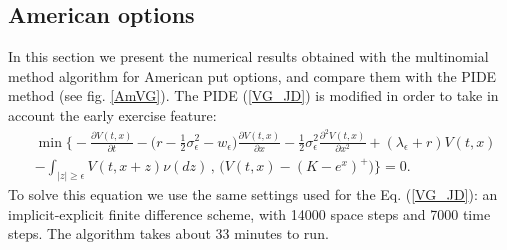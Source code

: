 \subsection{American options}

In this section we present the numerical results obtained with the multinomial method algorithm for American put options, and compare them with the PIDE method (see fig. \ref{AmVG}).
The PIDE (\ref{VG_JD}) is modified in order to take in account the early exercise feature:
\begin{align}\label{VG_Am_JD}
&  \min \biggl\{ - \frac{\partial V(t,x)}{\partial t} -
 \bigl( r-\frac{1}{2}\sigma_{\epsilon}^2 - w_{\epsilon} \bigr) \frac{\partial V(t,x)}{\partial x} 
 - \frac{1}{2}\sigma_{\epsilon}^2 \frac{\partial^2 V(t,x)}{\partial x^2} + (\lambda_{\epsilon} + r) V(t,x) \\ \nonumber
 &- \int_{|z| \geq \epsilon} V(t,x+z) \nu(dz) \, , \, \biggl( V(t,x) - (K-e^x)^+ \biggr) \biggr\} = 0.
\end{align}
To solve this equation we use the same settings used for the Eq. (\ref{VG_JD}): an implicit-explicit finite difference scheme, with 14000 space steps and 7000 time steps. 
The algorithm takes about 33 minutes to run.


